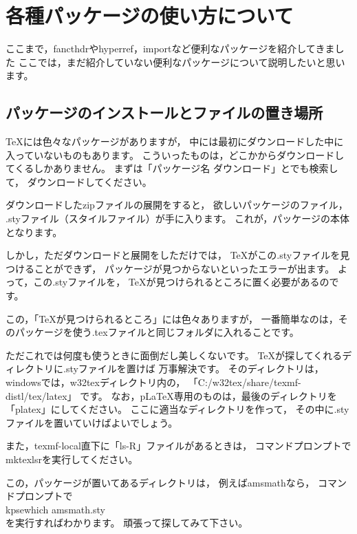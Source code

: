 \chapter{各種パッケージの使い方について}
\label{ch:packages}

ここまで，fancthdrやhyperref，importなど便利なパッケージを紹介してきました
ここでは，まだ紹介していない便利なパッケージについて説明したいと思います。



\section{パッケージのインストールとファイルの置き場所}
\label{sec:install-packages}

{\TeX}には色々なパッケージがありますが，
中には最初にダウンロードした中に入っていないものもあります。
こういったものは，どこかからダウンロードしてくるしかありません。
まずは「パッケージ名 ダウンロード」とでも検索して，
ダウンロードしてください。

ダウンロードしたzipファイルの展開をすると，
欲しいパッケージのファイル，
.styファイル（スタイルファイル）が手に入ります。
これが，パッケージの本体となります。

しかし，ただダウンロードと展開をしただけでは，
{\TeX}がこの.styファイルを見つけることができず，
パッケージが見つからないといったエラーが出ます。
よって，この.styファイルを，
{\TeX}が見つけられるところに置く必要があるのです。

この，「{\TeX}が見つけられるところ」には色々ありますが，
一番簡単なのは，そのパッケージを使う.texファイルと同じフォルダに入れることです。

ただこれでは何度も使うときに面倒だし美しくないです。
{\TeX}が探してくれるディレクトリに.styファイルを置けば
万事解決です。
そのディレクトリは，
windowsでは，w32texディレクトリ内の，
「C:/w32tex/share/texmf-distl/tex/latex」
です。
なお，p{\LaTeX}専用のものは，最後のディレクトリを「platex」にしてください。
ここに適当なディレクトリを作って，
その中に.styファイルを置いていけばよいでしょう。

また，texmf-local直下に「ls-R」ファイルがあるときは，
コマンドプロンプトでmktexlsrを実行してください。

この，パッケージが置いてあるディレクトリは，
例えばamsmathなら，
コマンドプロンプトで\\
\hspace{5zw} kpsewhich amsmath.sty \\
を実行すればわかります。
頑張って探してみて下さい。



